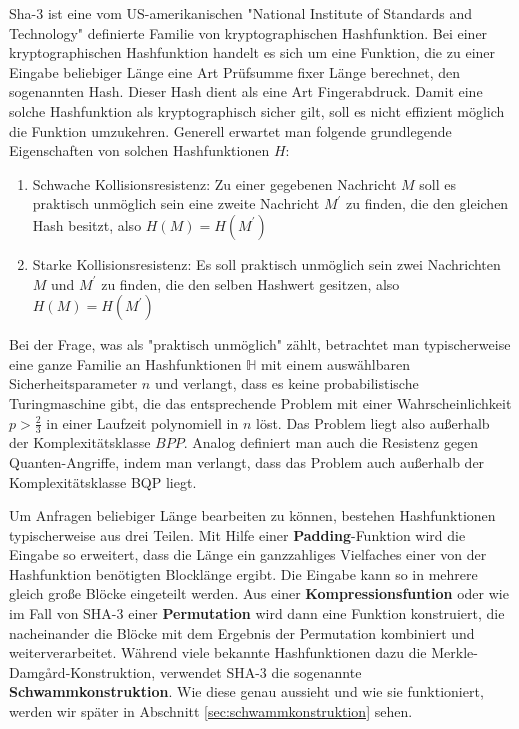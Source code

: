 Sha-3 ist eine vom US-amerikanischen "National Institute of Standards and Technology" definierte Familie von kryptographischen Hashfunktion.
Bei einer kryptographischen Hashfunktion handelt es sich um eine Funktion, die zu einer Eingabe beliebiger Länge eine Art Prüfsumme fixer Länge berechnet, den sogenannten Hash.
Dieser Hash dient als eine Art Fingerabdruck. Damit eine solche Hashfunktion als kryptographisch sicher gilt, soll es nicht effizient möglich die Funktion umzukehren.
Generell erwartet man folgende grundlegende Eigenschaften von solchen Hashfunktionen $H$:
\begin{enumerate}
	\item Schwache Kollisionsresistenz: Zu einer gegebenen Nachricht $M$ soll es praktisch unmöglich sein eine zweite Nachricht $M^\prime$ zu finden, die den gleichen Hash besitzt, also $H(M) = H(M^\prime)$
	\item Starke Kollisionsresistenz: Es soll praktisch unmöglich sein zwei Nachrichten $M$ und $M^\prime$ zu finden, die den selben Hashwert gesitzen, also $H(M) = H(M^\prime)$
\end{enumerate}
Bei der Frage, was als "praktisch unmöglich" zählt, betrachtet man typischerweise eine ganze Familie an Hashfunktionen $\mathbb{H}$ mit einem auswählbaren Sicherheitsparameter $n$ und verlangt,
dass es keine probabilistische Turingmaschine gibt, die das entsprechende Problem mit einer Wahrscheinlichkeit $p>\frac{2}{3}$ in einer Laufzeit polynomiell in $n$ löst.
Das Problem liegt also außerhalb der Komplexitätsklasse $BPP$. Analog definiert man auch die Resistenz gegen Quanten-Angriffe, indem man verlangt, dass das Problem auch außerhalb der Komplexitätsklasse BQP liegt.

Um Anfragen beliebiger Länge bearbeiten zu können, bestehen Hashfunktionen typischerweise aus drei Teilen. Mit Hilfe einer \textbf{Padding}-Funktion wird die Eingabe so erweitert,
dass die Länge ein ganzzahliges Vielfaches einer von der Hashfunktion benötigten Blocklänge ergibt. Die Eingabe kann so in mehrere gleich große Blöcke eingeteilt werden.
Aus einer \textbf{Kompressionsfuntion} oder wie im Fall von SHA-3 einer \textbf{Permutation} wird dann eine Funktion konstruiert,
die nacheinander die Blöcke mit dem Ergebnis der Permutation kombiniert und weiterverarbeitet. Während viele bekannte Hashfunktionen dazu die Merkle-Damg\r{a}rd-Konstruktion,
verwendet SHA-3 die sogenannte \textbf{Schwammkonstruktion}. Wie diese genau aussieht und wie sie funktioniert, werden wir später in Abschnitt \ref{sec:schwammkonstruktion} sehen.

